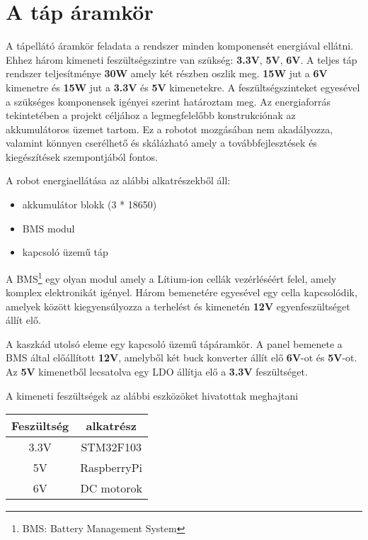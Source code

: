 \section{A táp áramkör}


A tápellátó áramkör feladata a rendszer minden komponensét energiával ellátni. Ehhez három kimeneti feszültségszintre van szükség: \textbf{3.3V}, \textbf{5V}, \textbf{6V}. A teljes táp rendszer teljesítménye \textbf{30W} amely két
részben oszlik meg. \textbf{15W} jut a \textbf{6V} kimenetre és \textbf{15W} jut a \textbf{3.3V} és \textbf{5V} kimenetekre. A feszültségszinteket egyesével a szükséges komponensek igényei szerint határoztam meg. Az energiaforrás
tekintetében a projekt céljához a legmegfelelőbb konstrukciónak az akkumulátoros üzemet tartom. Ez a robotot mozgásában nem akadályozza, valamint könnyen cserélhető és skálázható amely a továbbfejlesztések és kiegészítések
szempontjából fontos.

A robot energiaellátása az alábbi alkatrészekből áll:
\begin{itemize}
\item akkumulátor blokk (3 * 18650)
\item BMS modul
\item kapcsoló üzemű táp
\end{itemize}

A BMS\footnote{BMS: Battery Management System} egy olyan modul amely a Lítium-ion cellák vezérléséért felel, amely komplex elektronikát igényel. Három bemenetére egyesével egy cella kapcsolódik, amelyek között kiegyensúlyozza
a terhelést és kimenetén \textbf{12V} egyenfeszültséget állít elő.

A kaszkád utolsó eleme egy kapcsoló üzemű tápáramkör. A panel bemenete a BMS által előállított \textbf{12V}, amelyből két buck konverter állít elő \textbf{6V}-ot és \textbf{5V}-ot. Az \textbf{5V} kimenetből lecsatolva egy LDO
állítja elő a \textbf{3.3V} feszültséget.

A kimeneti feszültségek az alábbi eszközöket hivatottak meghajtani

\begin{center}
  \begin{tabular}{ | c | c | }
    \hline
    Feszültség & alkatrész 
    \\ \hline
    3.3V & STM32F103 \\
    5V & RaspberryPi \\
    6V & DC motorok
    \\ \hline
  \end{tabular}
\end{center}

